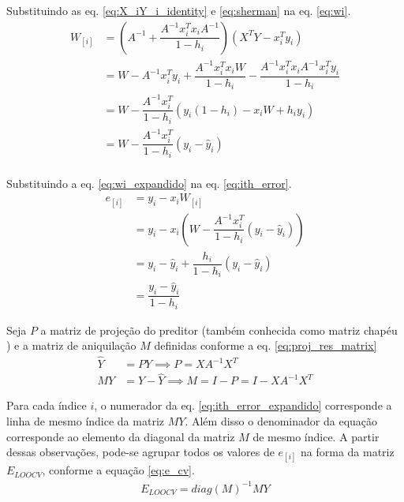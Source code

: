 Substituindo as eq. \ref{eq:X_iY_i_identity} e \ref{eq:sherman} na eq. \ref{eq:wi}.
\smallskip\noindent
\begin{equation}
    \begin{split}
        W_{[i]} &= \left(A^{-1} + \dfrac{A^{-1}x_i^Tx_iA^{-1}}{1-h_i}\right) \left(X^TY - x_i^Ty_i\right)\\
                &= W - A^{-1}x_i^Ty_i + \dfrac{A^{-1}x_i^Tx_iW}{1-h_i} - \dfrac{A^{-1}x_i^Tx_iA^{-1}x_i^Ty_i}{1-h_i} \\
                &= W - \dfrac{A^{-1}x_i^T}{1-h_i}\left(  y_i(1-h_i)-x_iW  + h_iy_i \right)  \\
                &= W - \dfrac{A^{-1}x_i^T}{1-h_i}\left(  y_i-\hat{y}_i \right)  \\
    \end{split}
    \label{eq:wi_expandido}
\end{equation}

Substituindo a eq. \ref{eq:wi_expandido} na eq. \ref{eq:ith_error}.
\smallskip\noindent
\begin{equation}
    \begin{split}
        e_{[i]} &= y_i - x_iW_{[i]} \\
                &= y_i - x_i\left( W - \dfrac{A^{-1}x_i^T}{1-h_i}\left(  y_i-\hat{y}_i \right) \right) \\
                &= y_i - \hat{y}_i + \dfrac{h_i}{1-h_i}\left(  y_i-\hat{y}_i \right) \\
                &= \dfrac{y_i- \hat{y}_i}{1-h_i}
    \end{split}    
    \label{eq:ith_error_expandido}
\end{equation}

Seja $P$ a matriz de projeção \cite[p. 303]{applied_matrix_algebra} do preditor (também conhecida como matriz chapéu
 \cite[p. 266]{lin_reg_analysis}) e a matriz de aniquilação $M$ \cite[p. 18]{econometrics} definidas conforme a eq. \ref{eq:proj_res_matrix}
\smallskip\noindent
\begin{equation}
    \begin{split}
        \hat{Y} &= PY \implies P = XA^{-1}X^T \\
        MY &= Y - \hat{Y} \implies M = I - P = I - XA^{-1}X^T
    \end{split}    
    \label{eq:proj_res_matrix}
\end{equation}

Para cada índice $i$, o numerador da eq. \ref{eq:ith_error_expandido} corresponde a linha de mesmo índice da matriz $MY$. 
Além disso o denominador da equação corresponde ao elemento da diagonal da matriz $M$ de mesmo índice. 
A partir dessas observações, pode-se agrupar todos os valores de $e_{[i]}$ na forma da matriz $E_{LOOCV}$, conforme a equação \ref{eq:e_cv}.
\smallskip\noindent
\begin{equation}
    \begin{split}
        E_{LOOCV} = diag(M)^{-1}MY
    \end{split}    
    \label{eq:e_cv}
\end{equation}

